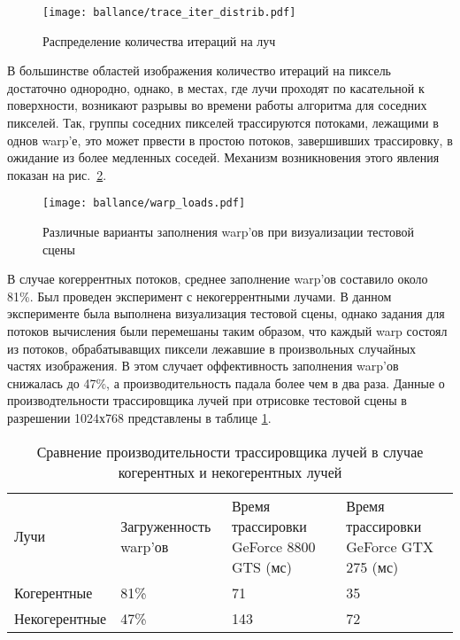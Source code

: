 \begin{figure}[h]
\center
\texttt{[image: ballance/trace\_iter\_distrib.pdf]}
\caption{Распределение количества итераций на луч}
\label{fig:trace_iter_distrib}
\end{figure}

В большинстве областей изображения количество итераций на пиксель достаточно однородно, однако, в местах, где лучи проходят по касательной к поверхности, возникают разрывы во времени работы алгоритма для соседних пикселей. Так, группы соседних пикселей трассируются потоками, лежащими в однов warp'е, это может првести в простою потоков, завершивших трассировку, в ожидание из более медленных соседей. Механизм возникновения этого явления показан на рис.~\ref{fig:warp_loads}.

\begin{figure}[h]
\center
\texttt{[image: ballance/warp\_loads.pdf]}
\caption{Различные варианты заполнения warp'ов при визуализации тестовой сцены}
\label{fig:warp_loads}
\end{figure}

В случае когеррентных потоков, среднее заполнение warp'ов составило около 81\%. Был проведен эксперимент с некогеррентными лучами. В данном эксперименте была выполнена визуализация тестовой сцены, однако задания для потоков вычисления были перемешаны таким образом, что каждый warp состоял из потоков, обрабатывавщих пиксели лежавшие в произвольных случайных частях изображения. В этом случает оффективность заполнения warp'ов снижалась до 47\%, а производительность падала более чем в два раза. Данные о производтельности трассировщика лучей при отрисовке тестовой сцены в разрешении 1024х768 представлены в таблице \ref{tab:coher_perf}.

\begin{table}[ht]
\center
\label{tab:coher_perf}
\begin{tabular}{l|p{}|p{}|p{}}
 Лучи  & Загруженность warp'ов & Время трассировки GeForce 8800 GTS (мс) &  Время трассировки GeForce GTX 275 (мс) \\
\cline{1-4}
  Когерентные  & 81\% & 71 & 35 \\
  Некогерентные & 47\% & 143 &  72 \\
\end{tabular}
\caption{Сравнение производительности трассировщика лучей в случае когерентных и некогерентных лучей}
\end{table}

